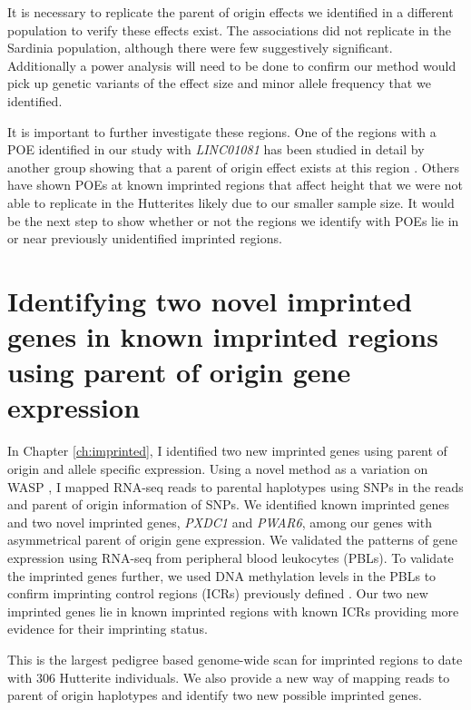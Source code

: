 It is necessary to replicate the parent of origin effects we identified in a different population to verify these effects exist. The associations did not replicate in the Sardinia population, although there were few suggestively significant. Additionally a power analysis will need to be done to confirm our method would pick up genetic variants of the effect size and minor allele frequency that we identified.

It is important to further investigate these regions. One of the regions with a POE identified in our study with \emph{LINC01081} has been studied in detail by another group showing that a parent of origin effect exists at this region \cite{Szafranski:2016fz}. Others have shown POEs at known imprinted regions that affect height \cite{Benonisdottir:2016dz,Zoledziewska:2015do} that we were not able to replicate in the Hutterites likely due to our smaller sample size. It would be the next step to show whether or not the regions we identify with POEs lie in or near previously unidentified imprinted regions.
 
\section{Identifying two novel imprinted genes in known imprinted regions using parent of origin gene expression}

In Chapter \ref{ch:imprinted}, I identified two new imprinted genes using parent of origin and allele specific expression. Using a novel method as a variation on WASP \cite{vandeGeijn:2015hi}, I mapped RNA-seq reads to parental haplotypes using SNPs in the reads and parent of origin information of SNPs. We identified known imprinted genes and two novel imprinted genes, \emph{PXDC1} and \emph{PWAR6}, among our genes with asymmetrical parent of origin gene expression. We validated the patterns of gene expression using RNA-seq from peripheral blood leukocytes (PBLs). To validate the imprinted genes further, we used DNA methylation levels in the PBLs to confirm imprinting control regions (ICRs) previously defined \cite{Joshi:2016bb,Court:2014kc}. Our two new imprinted genes lie in known imprinted regions with known ICRs providing more evidence for their imprinting status.
 
This is the largest pedigree based genome-wide scan for imprinted regions to date with 306 Hutterite individuals. We also provide a new way of mapping reads to parent of origin haplotypes and identify two new possible imprinted genes.

